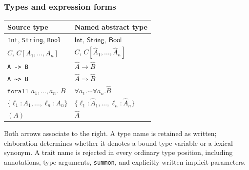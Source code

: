 \documentclass[10pt,a4paper]{article}
\newcommand{\Int}{\mathsf{Int}}
\newcommand{\Str}{\mathsf{String}}
\newcommand{\Bool}{\mathsf{Bool}}
\begin{document}
\subsubsection*{Types and expression forms}
\begin{center}
\renewcommand{\arraystretch}{1.18}
\begin{tabular}{@{}ll@{}}
\toprule
Source type & Named abstract type\\
\midrule
\texttt{Int}, \texttt{String}, \texttt{Bool} & $\Int,\ \Str,\ \Bool$\\
$C$, $C[A_1,\ldots,A_n]$ & $C$, $C[\hat A_1,\ldots,\hat A_n]$\\
\texttt{A -> B} & $\hat A\to\hat B$\\
\texttt{A \textasciitilde{}> B} & $\hat A\Rightarrow\hat B$\\
$\texttt{forall }a_1,\ldots,a_n\texttt{. }B$ & $\forall a_1.\cdots\forall a_n.\hat B$\\
$\{\ell_1:A_1,\ldots,\ell_n:A_n\}$ & $\{\ell_1:\hat A_1,\ldots,\ell_n:\hat A_n\}$\\
$(A)$ & $\hat A$\\
\bottomrule
\end{tabular}
\end{center}
Both arrows associate to the right. A type name is retained as written; elaboration
determines whether it denotes a bound type variable or a lexical synonym. A trait name
is rejected in every ordinary type position, including annotations, type arguments,
\texttt{summon}, and explicitly written implicit parameters.
\end{document}
